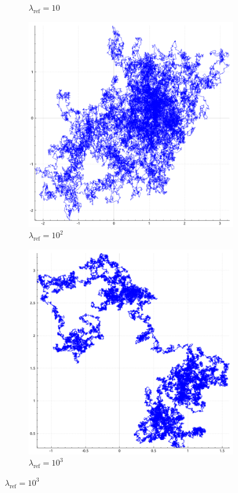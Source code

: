 \documentclass[report.tex]{subfiles}
\begin{document}
\begin{figure}
\begin{subfigure}{.25\textwidth}
    \caption*{$\lambda_{\text{ref}} = 10$}
  \end{subfigure}
  \begin{subfigure}{.25\textwidth}
    \includegraphics[width=\textwidth]{img/bps_ref_100}
    \caption*{$\lambda_{\text{ref}} = 10^{2}$}
  \end{subfigure}
  \begin{subfigure}{.25\textwidth}
    \includegraphics[width=\textwidth]{img/bps_ref_1000}
    \caption*{$\lambda_{\text{ref}} = 10^{3}$}
  \end{subfigure}


\end{figure}
\end{document}
